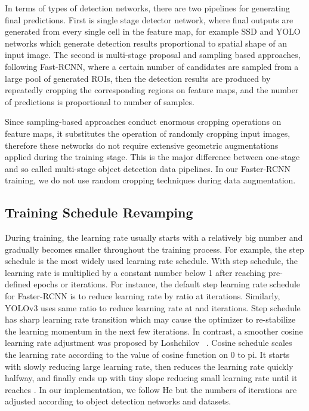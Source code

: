 \documentclass[10pt,twocolumn,letterpaper]{article}
\begin{document}
In terms of types of detection networks, there are two pipelines for generating final predictions. First is single stage detector network, where final outputs are generated from every single cell in the feature map, for example SSD\cite{liu2016ssd} and YOLO\cite{redmon2018yolov3} networks which generate detection results proportional to spatial shape of an input image. The second is multi-stage proposal and sampling based approaches, following Fast-RCNN\cite{ren2015faster}, where a certain number of candidates are sampled from a large pool of generated ROIs, then the detection results are produced by repeatedly cropping the corresponding regions on feature maps, and the number of predictions is proportional to number of samples.

Since sampling-based approaches conduct enormous cropping operations on feature maps, it substitutes the operation of randomly cropping input images, therefore these networks do not require extensive geometric augmentations applied during the training stage. This is the major difference between one-stage and so called multi-stage object detection data pipelines. In our Faster-RCNN training, we do not use random cropping techniques during data augmentation.


\subsection{Training Schedule Revamping}
During training, the learning rate usually starts with a relatively big number and gradually becomes smaller throughout the training process. For example, the step schedule is the most widely used learning rate schedule. With step schedule, the learning rate is multiplied by a constant number below 1 after reaching pre-defined epochs or iterations. For instance, the default step learning rate schedule for Faster-RCNN \cite{ren2015faster} is to reduce learning rate by ratio  at  iterations. Similarly, YOLOv3 \cite{redmon2018yolov3} uses same ratio  to reduce learning rate at  and  iterations. Step schedule has sharp learning rate transition which may cause the optimizer to re-stabilize the learning momentum in the next few iterations. In contrast, a smoother cosine learning rate adjustment was proposed by Loshchilov \etal~\cite{loshchilov2016sgdr}. 
Cosine schedule scales the learning rate according to the value of cosine function on 0 to pi. It starts with slowly reducing large learning rate, then reduces the learning rate quickly halfway, and finally ends up with tiny slope reducing small learning rate until it reaches . In our implementation, we follow He \etal \cite{he2018bag} but the numbers of iterations are adjusted according to object detection networks and datasets.
\end{document}
